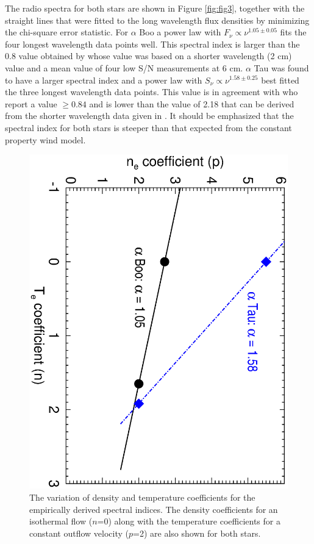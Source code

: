 \documentclass[iop]{emulateapj}
\begin{document}
The radio spectra for both stars are shown in Figure \ref{fig:fig3}, together with the straight lines that were fitted to the long wavelength flux densities by minimizing the chi-square error statistic. For $\alpha$ Boo a power law with $F_{\nu} \propto \nu ^{1.05 \pm 0.05}$ fits the four longest wavelength data points well. This spectral index is larger than the 0.8 value obtained by \cite{1986AJ.....91..602D} whose value was based on a shorter wavelength (2 cm) value and a mean value of four low S/N measurements at 6 cm. $\alpha$ Tau was found to have a larger spectral index and a power law with $S_{\nu} \propto \nu ^{1.58 \pm 0.25}$ best fitted the three longest wavelength data points. This value is in agreement with \cite{1986AJ.....91..602D} who report a value $\ge 0.84$ and is lower than the value of 2.18 that can be derived from the shorter wavelength data given in \cite{2007ApJ...655..946W}. It should be emphasized that the spectral index for both stars is steeper than that expected from the constant property wind model. 

\begin{figure}
\includegraphics[trim = 0mm 11mm 10mm 21mm, clip,scale=0.4,angle=90]{fig4.ps}
\caption{The variation of density and temperature coefficients for the empirically derived spectral indices. The density coefficients for an isothermal flow ($n$=0) along with the temperature coefficients for a constant outflow velocity ($p$=2) are also shown for both stars.}
\label{fig:fig4}
\end{figure}
\end{document}
